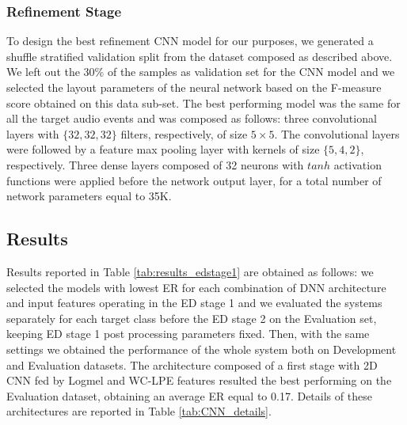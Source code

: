 \subsubsection{Refinement Stage}
To design the best refinement CNN model for our purposes, we generated a shuffle stratified validation split from the dataset composed as described above. We left out the 30\% of the samples as validation set for the CNN model and we selected the layout parameters of the neural network based on the F-measure score obtained on this data sub-set. 
The best performing model was the same for all the target audio events and was composed as follows: three convolutional layers with $\{32,32,32\}$ filters, respectively, of size $5\times5$. The convolutional layers were followed by a feature max pooling layer with kernels of size $\{5,4,2\}$, respectively. Three dense layers composed of 32 neurons with $tanh$ activation functions were applied before the network output layer, for a total number of network parameters equal to 35K. 


\subsection{Results}
Results reported in Table \ref{tab:results_edstage1} are obtained as follows: we selected the models with lowest ER for each combination of DNN architecture and input features operating in the ED stage 1 and we evaluated the systems separately for each target class before the ED stage 2 on the Evaluation set, keeping ED stage 1 post processing parameters fixed. Then, with the same settings we obtained the performance of the whole system both on Development and Evaluation datasets. The architecture composed of a first stage with 2D CNN fed by Logmel and WC-LPE features resulted the best performing on the Evaluation dataset, obtaining an average ER equal to 0.17.
Details of these architectures are reported in Table \ref{tab:CNN_details}.



